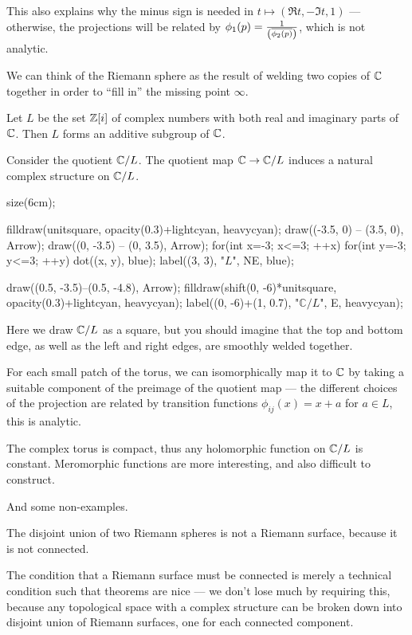 \begin{example}
	This also explains why the minus sign is needed in $t \mapsto (\Re t, -\Im t, 1)$ ---
	otherwise, the projections will be related by
	$\phi_1(p) = \frac{1}{\left(\overline{\phi_2(p)}\right)}$, which is not analytic.

	We can think of the Riemann sphere as the result of welding two copies of $\mathbb C$ together in order
	to ``fill in'' the missing point $\infty$.
\end{example}

\begin{example}
	Let $L$ be the set $\mathbb Z[i]$ of complex numbers with both real and imaginary parts of $\mathbb C$.
	Then $L$ forms an additive subgroup of $\mathbb C$.

	Consider the quotient $\mathbb C/L$. The quotient map $\mathbb C \to \mathbb C/L$ induces a natural complex
	structure on $\mathbb C/L$.

	\begin{center}
		\begin{asy}
			size(6cm);

			filldraw(unitsquare, opacity(0.3)+lightcyan, heavycyan);
			draw((-3.5, 0) -- (3.5, 0), Arrow);
			draw((0, -3.5) -- (0, 3.5), Arrow);
			for(int x=-3; x<=3; ++x) for(int y=-3; y<=3; ++y) dot((x, y), blue);
			label((3, 3), "$L$", NE, blue);

			draw((0.5, -3.5)--(0.5, -4.8), Arrow);
			filldraw(shift(0, -6)*unitsquare, opacity(0.3)+lightcyan, heavycyan);
			label((0, -6)+(1, 0.7), "$\mathbb{C}/L$", E, heavycyan);
		\end{asy}
	\end{center}

	Here we draw $\mathbb C/L$ as a square, but you should imagine that the top and bottom edge, as well
	as the left and right edges, are smoothly welded together.

	For each small patch of the torus, we can isomorphically map it to $\mathbb C$ by taking a suitable
	component of the preimage of the quotient map --- the different choices of the projection are
	related by transition functions $\phi_{ij}(x) = x + a$ for $a \in L$, this is analytic.

	The complex torus is compact, thus any holomorphic function on $\mathbb C/L$ is constant. Meromorphic
	functions are more interesting, and also difficult to construct.
\end{example}

And some non-examples.
\begin{example}
	The disjoint union of two Riemann spheres is not a Riemann surface, because it is not connected.
\end{example}
The condition that a Riemann surface must be connected is merely a technical condition such that
theorems are nice --- we don't lose much by requiring this, because any topological space with a
complex structure can be broken down into disjoint union of Riemann surfaces, one for each connected
component.

